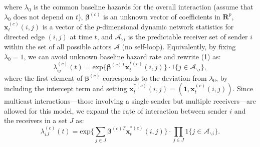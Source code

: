 \documentclass[a4paper]{article}
\begin{document}
where $\lambda_0$ is the common baseline hazards for the overall interaction (assume that $\lambda_0$ does not depend on $t$), $\boldsymbol{\beta}^{(c)}$ is an unknown vector of coefficients in $\boldsymbol{R}^{p}$, $\boldsymbol{x}^{(c)}_t(i, j)$ is a vector of the $p$-dimensional dynamic network statistics for directed edge $(i, j)$ at time $t$, and $\mathcal{A}_{\backslash i}$ is the predictable receiver set of sender $i$ within the set of all possible actors $\mathcal{A}$ (no self-loop). Equivalently, by fixing $\lambda_0=1$, we can avoid unknown baseline hazard rate and rewrite (1) as: 
\begin{equation}
\lambda^{(c)}_{ij}(t)= \mbox{exp}\Big\{\boldsymbol{\beta}^{(c)T}\boldsymbol{x}^{*(c)}_t(i, j)\Big\}\cdot 1\{j \in \mathcal{A}_{\backslash i}\},
\end{equation}
where the first element of $\boldsymbol{\beta}^{(c)}$ corresponds to the deviation from $\lambda_0$, by including the intercept term and setting $\boldsymbol{x}^{*(c)}_t(i, j)=(\boldsymbol{1}, \boldsymbol{x}^{(c)}_t(i, j))$. Since multicast interactions—those involving a single sender but multiple
receivers—are allowed for this model, we expand the rate of interaction between sender $i$ and the receivers in a set $J$ as:
\begin{equation}
\lambda^{(c)}_{iJ}(t)= \mbox{exp}\Big\{\sum\limits_{j \in J} \boldsymbol{\beta}^{(c)T}\boldsymbol{x}^{*(c)}_t(i, j)\Big\}\cdot \prod\limits_{j \in J}1\{j \in \mathcal{A}_{\backslash i}\}.
\end{equation}
\end{document}
